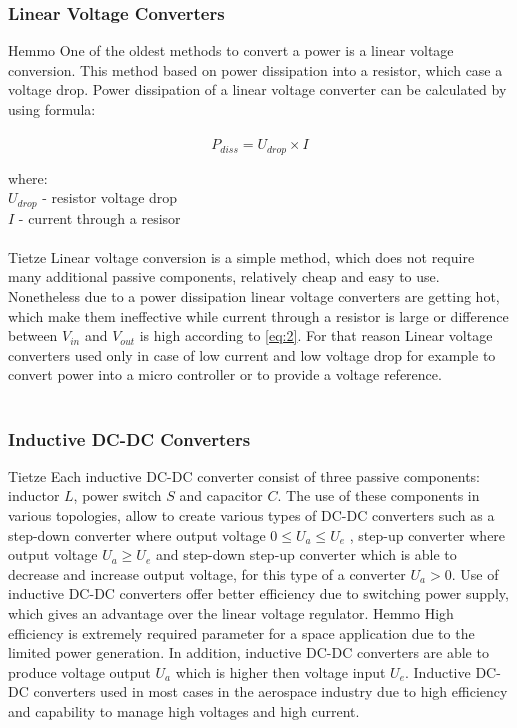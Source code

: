\subsubsection{Linear Voltage Converters \label{sec:tech}}

Hemmo\cite{18} One of the oldest methods to convert a power is a linear voltage conversion. This method based on power dissipation into a resistor, which case a voltage drop. Power dissipation of a linear voltage converter can be calculated by using formula:\\ \\

\begin{equation}\label{eq:2}
P_{diss}=U_{drop} \times I
\end{equation}


where:\\
$U_{drop}$ - resistor voltage drop\\
$I$ - current through a resisor\\ \\
 Tietze \cite{18} Linear voltage conversion is a simple method, which does not require many additional passive components, relatively cheap and easy to use. Nonetheless due to a power dissipation linear voltage converters are getting hot, which make them ineffective while current through a resistor is large or difference between $V_{in}$ and $V_{out}$ is high according to \eqref{eq:2}. For that reason Linear voltage converters used only in case of low current and low voltage drop for example to convert power into a micro controller or to provide a voltage reference.\\
 \\
 
 
\subsubsection{Inductive DC-DC Converters \label{sec:tech}}

Tietze\cite{18} Each inductive DC-DC converter consist of three passive components: inductor $L$, power switch $S$ and capacitor $C$. The use of these components in various topologies, allow to create various types of DC-DC converters such as a step-down converter where output voltage $0 \leq U_{a} \leq U_{e} $ , step-up converter where output voltage $U_{a} \geq U_{e} $  and   step-down step-up converter which is able to decrease and increase output voltage, for this type of a converter $ U_{a} > 0$. Use of inductive DC-DC converters offer better efficiency due to switching power supply, which gives an advantage over the linear voltage regulator. Hemmo\cite{17} High efficiency is extremely required parameter for a space application due to the limited power generation. In addition, inductive DC-DC converters are able to produce  voltage output $U_{a}$ which is higher then voltage input $U_{e}$. Inductive DC-DC converters used in most cases in the aerospace industry due to high efficiency and capability to manage high voltages and high current.

